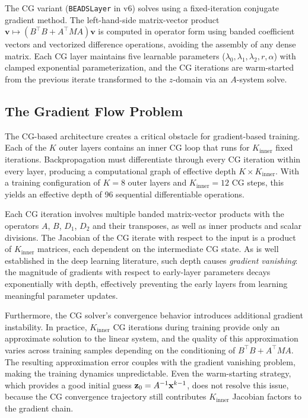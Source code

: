 The CG variant (\texttt{BEADSLayer} in v6) solves  using a fixed-iteration conjugate gradient method. The left-hand-side matrix-vector product $\mathbf{v} \mapsto (B^\top B + A^\top M A)\mathbf{v}$ is computed in operator form using banded coefficient vectors and vectorized difference operations, avoiding the assembly of any dense matrix. Each CG layer maintains five learnable parameters ($\lambda_0, \lambda_1, \lambda_2, r, \alpha$) with clamped exponential parameterization, and the CG iterations are warm-started from the previous iterate transformed to the $z$-domain via an $A$-system solve.


\subsection{The Gradient Flow Problem}
\label{sec:method_cg_problem}

The CG-based architecture creates a critical obstacle for gradient-based training. Each of the $K$ outer layers contains an inner CG loop that runs for $K_{\text{inner}}$ fixed iterations. Backpropagation must differentiate through every CG iteration within every layer, producing a computational graph of effective depth $K \times K_{\text{inner}}$. With a training configuration of $K = 8$ outer layers and $K_{\text{inner}} = 12$ CG steps, this yields an effective depth of 96 sequential differentiable operations.

Each CG iteration involves multiple banded matrix-vector products with the operators $A$, $B$, $D_1$, $D_2$ and their transposes, as well as inner products and scalar divisions. The Jacobian of the CG iterate with respect to the input is a product of $K_{\text{inner}}$ matrices, each dependent on the intermediate CG state. As is well established in the deep learning literature, such depth causes \emph{gradient vanishing}: the magnitude of gradients with respect to early-layer parameters decays exponentially with depth, effectively preventing the early layers from learning meaningful parameter updates.

Furthermore, the CG solver's convergence behavior introduces additional gradient instability. In practice, $K_{\text{inner}}$ CG iterations during training provide only an approximate solution to the linear system, and the quality of this approximation varies across training samples depending on the conditioning of $B^\top B + A^\top M A$. The resulting approximation error couples with the gradient vanishing problem, making the training dynamics unpredictable. Even the warm-starting strategy, which provides a good initial guess $\mathbf{z}_0 = A^{-1}\mathbf{x}^{k-1}$, does not resolve this issue, because the CG convergence trajectory still contributes $K_{\text{inner}}$ Jacobian factors to the gradient chain.


